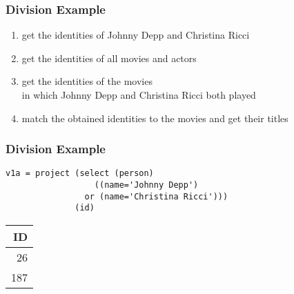 \documentclass[dvipsnames]{beamer}
\theoremstyle{plain}
\begin{document}
\begin{frame}
  \frametitle{Division Example}

  \begin{example}
    \pause
    \begin{enumerate}
      \item get the identities of Johnny Depp and Christina Ricci

      \pause
      \item get the identities of all movies and actors

      \pause
      \item get the identities of the movies\\
	in which Johnny Depp and Christina Ricci both played

      \pause
      \item match the obtained identities to the movies and get their titles
    \end{enumerate}
  \end{example}
\end{frame}

\begin{frame}[fragile]
  \frametitle{Division Example}

  \begin{example}
    \begin{lstlisting}
v1a = project (select (person)
                  ((name='Johnny Depp')
                or (name='Christina Ricci')))
              (id)
    \end{lstlisting}

    \pause
    \begin{tiny}
    \begin{table}
      \begin{tabular}{|r|}\hline
 ID\\\hline\hline
 26\\\hline
187\\\hline
      \end{tabular}
    \end{table}
    \end{tiny}
  \end{example}
\end{frame}
\end{document}
